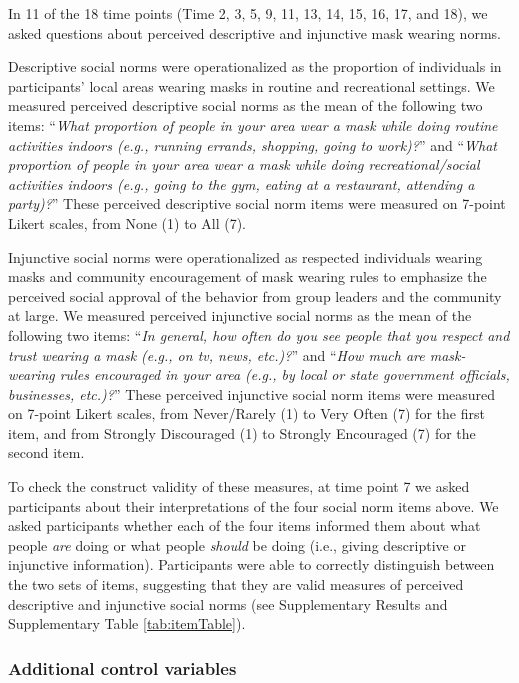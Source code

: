 \documentclass[
  man, donotrepeattitle,floatsintext]{apa6}
\begin{document}
In 11 of the 18 time points (Time 2, 3, 5, 9, 11, 13, 14, 15, 16, 17, and 18), we asked questions about perceived descriptive and injunctive mask wearing norms.

Descriptive social norms were operationalized as the proportion of individuals in participants' local areas wearing masks in routine and recreational settings. We measured perceived descriptive social norms as the mean of the following two items: ``\emph{What proportion of people in your area wear a mask while doing routine activities indoors (e.g., running errands, shopping, going to work)?}'' and ``\emph{What proportion of people in your area wear a mask while doing recreational/social activities indoors (e.g., going to the gym, eating at a restaurant, attending a party)?}'' These perceived descriptive social norm items were measured on 7-point Likert scales, from None (1) to All (7).

Injunctive social norms were operationalized as respected individuals wearing masks and community encouragement of mask wearing rules to emphasize the perceived social approval of the behavior from group leaders and the community at large. We measured perceived injunctive social norms as the mean of the following two items: ``\emph{In general, how often do you see people that you respect and trust wearing a mask (e.g., on tv, news, etc.)?}'' and ``\emph{How much are mask-wearing rules encouraged in your area (e.g., by local or state government officials, businesses, etc.)?}'' These perceived injunctive social norm items were measured on 7-point Likert scales, from Never/Rarely (1) to Very Often (7) for the first item, and from Strongly Discouraged (1) to Strongly Encouraged (7) for the second item.

To check the construct validity of these measures, at time point 7 we asked participants about their interpretations of the four social norm items above. We asked participants whether each of the four items informed them about what people \emph{are} doing or what people \emph{should} be doing (i.e., giving descriptive or injunctive information). Participants were able to correctly distinguish between the two sets of items, suggesting that they are valid measures of perceived descriptive and injunctive social norms (see Supplementary Results and Supplementary Table \ref{tab:itemTable}).

\hypertarget{additional-control-variables}{%
\subsubsection{Additional control variables}\label{additional-control-variables}}
\end{document}
